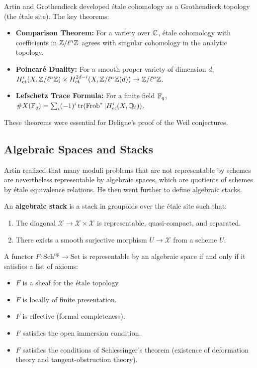 Artin and Grothendieck developed \'etale cohomology as a Grothendieck topology (the \'etale site). The key theorems:
\begin{itemize}
    \item \textbf{Comparison Theorem:} For a variety over $\mathbb{C}$, \'etale cohomology with coefficients in $\mathbb{Z}/\ell^n\mathbb{Z}$ agrees with singular cohomology in the analytic topology.
    \item \textbf{Poincar\'e Duality:} For a smooth proper variety of dimension $d$, $H^i_{\operatorname{et}}(X, \mathbb{Z}/\ell^n\mathbb{Z}) \times H^{2d-i}_{\operatorname{et}}(X, \mathbb{Z}/\ell^n\mathbb{Z}(d)) \to \mathbb{Z}/\ell^n\mathbb{Z}$.
    \item \textbf{Lefschetz Trace Formula:} For a finite field $\mathbb{F}_q$, $\#X(\mathbb{F}_q) = \sum_i (-1)^i \operatorname{tr}(\operatorname{Frob}^* | H^i_{\operatorname{et}}(X, \mathbb{Q}_\ell))$.
\end{itemize}

These theorems were essential for Deligne's proof of the Weil conjectures.

\subsection{Algebraic Spaces and Stacks}

Artin realized that many moduli problems that are not representable by schemes are nevertheless representable by algebraic spaces, which are quotients of schemes by \'etale equivalence relations. He then went further to define algebraic stacks.

\begin{definition}
An \textbf{algebraic stack} is a stack in groupoids over the \'etale site such that:
\begin{enumerate}
    \item The diagonal $\mathcal{X} \to \mathcal{X} \times \mathcal{X}$ is representable, quasi-compact, and separated.
    \item There exists a smooth surjective morphism $U \to \mathcal{X}$ from a scheme $U$.
\end{enumerate}
\end{definition}

\begin{theorem}
A functor $F: \mathrm{Sch}^{\mathrm{op}} \to \mathrm{Set}$ is representable by an algebraic space if and only if it satisfies a list of axioms:
\begin{itemize}
    \item $F$ is a sheaf for the \'etale topology.
    \item $F$ is locally of finite presentation.
    \item $F$ is effective (formal completeness).
    \item $F$ satisfies the open immersion condition.
    \item $F$ satisfies the conditions of Schlessinger's theorem (existence of deformation theory and tangent-obstruction theory).
\end{itemize}
\end{theorem}


